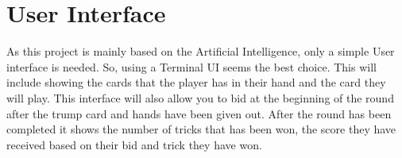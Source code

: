 \section{User Interface}
As this project is mainly based on the Artificial Intelligence, only a simple User interface is needed. So, using a Terminal UI seems the best choice. This will include showing the cards that the player has in their hand and the card they will play. This interface will also allow you to bid at the beginning of the round after the trump card and hands have been given out. After the round has been completed it shows the number of tricks that has been won, the score they have received based on their bid and trick they have won.



